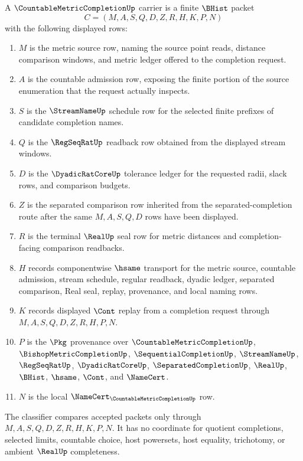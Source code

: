 \begin{definition}
\label{def:countable-metric-completion-carrier}
A $\CountableMetricCompletionUp$ carrier is a finite $\BHist$ packet
$$
C=(M,A,S,Q,D,Z,R,H,K,P,N)
$$
with the following displayed rows:
\begin{enumerate}
\item $M$ is the metric source row, naming the source point reads, distance comparison windows, and metric ledger offered to the completion request.
\item $A$ is the countable admission row, exposing the finite portion of the source enumeration that the request actually inspects.
\item $S$ is the $\StreamNameUp$ schedule row for the selected finite prefixes of candidate completion names.
\item $Q$ is the $\RegSeqRatUp$ readback row obtained from the displayed stream windows.
\item $D$ is the $\DyadicRatCoreUp$ tolerance ledger for the requested radii, slack rows, and comparison budgets.
\item $Z$ is the separated comparison row inherited from the separated-completion route after the same $M,A,S,Q,D$ rows have been displayed.
\item $R$ is the terminal $\RealUp$ seal row for metric distances and completion-facing comparison readbacks.
\item $H$ records componentwise $\hsame$ transport for the metric source, countable admission, stream schedule, regular readback, dyadic ledger, separated comparison, Real seal, replay, provenance, and local naming rows.
\item $K$ records displayed $\Cont$ replay from a completion request through $M,A,S,Q,D,Z,R,H,P,N$.
\item $P$ is the $\Pkg$ provenance over $\CountableMetricCompletionUp$, $\BishopMetricCompletionUp$, $\SequentialCompletionUp$, $\StreamNameUp$, $\RegSeqRatUp$, $\DyadicRatCoreUp$, $\SeparatedCompletionUp$, $\RealUp$, $\BHist$, $\hsame$, $\Cont$, and $\NameCert$.
\item $N$ is the local $\NameCert_{\CountableMetricCompletionUp}$ row.
\end{enumerate}
The classifier compares accepted packets only through $M,A,S,Q,D,Z,R,H,K,P,N$. It has no coordinate for quotient completions, selected limits, countable choice, host powersets, host equality, trichotomy, or ambient $\RealUp$ completeness.
\end{definition}

